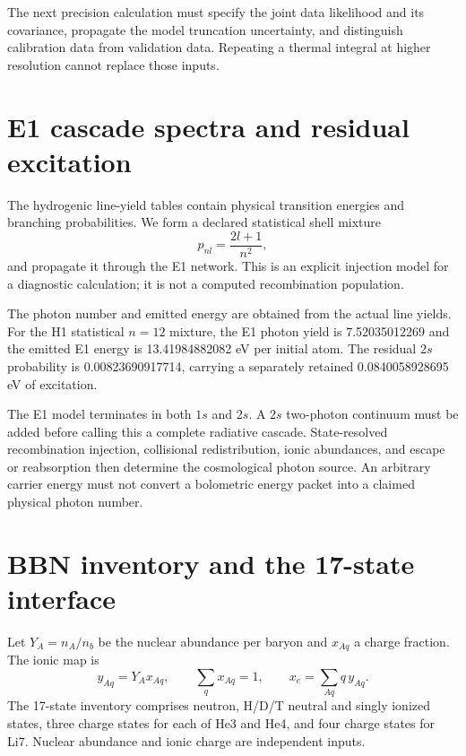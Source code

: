\documentclass[
  10pt,
]{article}
\begin{document}
The next precision calculation must specify the joint data likelihood
and its covariance, propagate the model truncation uncertainty, and
distinguish calibration data from validation data. Repeating a thermal
integral at higher resolution cannot replace those inputs.

\hypertarget{e1-cascade-spectra-and-residual-excitation}{%
\section{E1 cascade spectra and residual
excitation}\label{e1-cascade-spectra-and-residual-excitation}}

The hydrogenic line-yield tables contain physical transition energies
and branching probabilities. We form a declared statistical shell
mixture \[
p_{nl}=\frac{2l+1}{n^2},
\] and propagate it through the E1 network. This is an explicit
injection model for a diagnostic calculation; it is not a computed
recombination population.

The photon number and emitted energy are obtained from the actual line
yields. For the H1 statistical \(n=12\) mixture, the E1 photon yield is
7.52035012269 and the emitted E1 energy is 13.41984882082 eV per initial
atom. The residual \(2s\) probability is 0.00823690917714, carrying a
separately retained 0.0840058928695 eV of excitation.

The E1 model terminates in both \(1s\) and \(2s\). A \(2s\) two-photon
continuum must be added before calling this a complete radiative
cascade. State-resolved recombination injection, collisional
redistribution, ionic abundances, and escape or reabsorption then
determine the cosmological photon source. An arbitrary carrier energy
must not convert a bolometric energy packet into a claimed physical
photon number.

\hypertarget{bbn-inventory-and-the-17-state-interface}{%
\section{BBN inventory and the 17-state
interface}\label{bbn-inventory-and-the-17-state-interface}}

Let \(Y_A=n_A/n_b\) be the nuclear abundance per baryon and \(x_{Aq}\) a
charge fraction. The ionic map is \[
y_{Aq}=Y_Ax_{Aq},\qquad
\sum_qx_{Aq}=1,\qquad
x_e=\sum_{Aq}q\,y_{Aq}.
\] The 17-state inventory comprises neutron, H/D/T neutral and singly
ionized states, three charge states for each of He3 and He4, and four
charge states for Li7. Nuclear abundance and ionic charge are
independent inputs.
\end{document}
